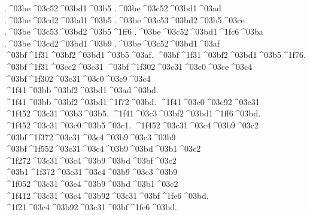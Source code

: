 {.^^^^03be^^^^03c52^^^^03bd1^^^^03b5
.^^^^03be^^^^03c52^^^^03bd1^^^^03ad
.^^^^03be^^^^03cd2^^^^03bd1^^^^03b5
	.^^^^03be^^^^03c53^^^^03bd2^^^^03b5^^^^03ce 		%
	.^^^^03be^^^^03c53^^^^03bd2^^^^03b5^^^^1ff6
.^^^^03be^^^^03c52^^^^03bd1^^^^1fc6^^^^03ba 		%
.^^^^03be^^^^03cd2^^^^03bd1^^^^03b9  		%
.^^^^03be^^^^03c52^^^^03bd1^^^^03af  		%
^^^^03bf^^^^1f31^^^^03bf2^^^^03bd1^^^^03b5^^^^03af.		%
^^^^03bf^^^^1f31^^^^03bf2^^^^03bd1^^^^03b5^^^^1f76.
^^^^03bf^^^^1f31^^^^03cc2^^^^03c31		%
^^^^03bf^^^^1f302^^^^03c31^^^^03c0^^^^03ce^^^^03c4 		%
^^^^03bf^^^^1f302^^^^03c31^^^^03c0^^^^03c9^^^^03c4
^^^^1f41^^^^03bb^^^^03bf2^^^^03bd1^^^^03ad^^^^03bd.
^^^^1f41^^^^03bb^^^^03bf2^^^^03bd1^^^^1f72^^^^03bd.
^^^^1f41^^^^03c0^^^^03c92^^^^03c31			%
^^^^1f452^^^^03c31^^^^03b3^^^^03b5.               %
^^^^1f41^^^^03c3^^^^03bf2^^^^03bd1^^^^1ff6^^^^03bd.  		%
^^^^1f452^^^^03c31^^^^03c0^^^^03b5^^^^03c1.		%
^^^^1f452^^^^03c31^^^^03c4^^^^03b9^^^^03c2 		%
 ^^^^03bf^^^^1f372^^^^03c31^^^^03c4^^^^03b9^^^^03c3^^^^03b9		%
 ^^^^03bf^^^^1f552^^^^03c31^^^^03c4^^^^03b9^^^^03bd^^^^03b1^^^^03c2		%
 ^^^^1f272^^^^03c31^^^^03c4^^^^03b9^^^^03bd^^^^03bf^^^^03c2 		%
 ^^^^03b1^^^^1f372^^^^03c31^^^^03c4^^^^03b9^^^^03c3^^^^03b9   		%
 ^^^^1f052^^^^03c31^^^^03c4^^^^03b9^^^^03bd^^^^03b1^^^^03c2 		%
 ^^^^1f412^^^^03c31^^^^03c4^^^^03b92^^^^03c31^^^^03bf^^^^1fe6^^^^03bd.	%
 ^^^^1f21^^^^03c4^^^^03b92^^^^03c31^^^^03bf^^^^1fe6^^^^03bd.  		%
}
